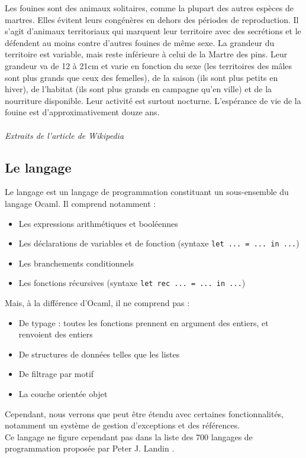Les fouines sont des animaux solitaires, comme la plupart des autres espèces de martres. Elles évitent leurs congénères en dehors des périodes de reproduction. Il s'agit d'animaux territoriaux qui marquent leur territoire avec des secrétions et le défendent au moins contre d'autres fouines de même sexe. La grandeur du territoire est variable, mais reste inférieure à celui de la Martre des pins. Leur grandeur va de 12 à 21cm et varie en fonction du sexe (les territoires des mâles sont plus grands que ceux des femelles), de la saison (ils sont plus petits en hiver), de l'habitat (ils sont plus grands en campagne qu'en ville) et de la nourriture disponible. Leur activité est surtout nocturne. L’espérance de vie de la fouine est d’approximativement douze ans. \\ ~ \\

\textit{Extraits de l'article de Wikipedia \cite{WikiFouine}}

\subsection{Le langage \fouine}

Le langage \fouine est un langage de programmation constituant un sous-ensemble du langage Ocaml. Il comprend notamment :
\begin{itemize}
 \item Les expressions arithmétiques et booléennes
 \item Les déclarations de variables et de fonction (syntaxe \texttt{let ... = ... in ...})
 \item Les branchements conditionnels
 \item Les fonctions récursives (syntaxe \texttt{let rec ... = ... in ...})
\end{itemize}

Mais, à la différence d'Ocaml, il ne comprend pas :
\begin{itemize}
 \item De typage : toutes les fonctions prennent en argument des entiers, et renvoient des entiers
 \item De structures de données telles que les listes
 \item De filtrage par motif
 \item La couche orientée objet
\end{itemize}

Cependant, nous verrons que \fouine peut être étendu avec certaines fonctionnalités, notamment un système de gestion d'exceptions et des références.\\
Ce langage ne figure cependant pas dans la liste des 700 langages de programmation proposée par Peter J. Landin \cite{DBLP:journals/cacm/Landin66}.

